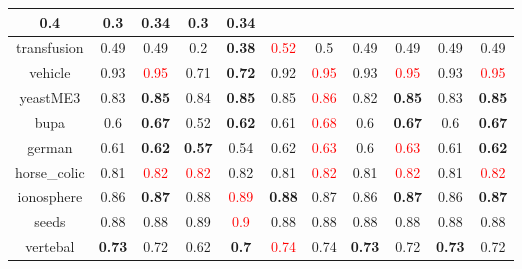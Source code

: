 \documentclass{article}%
\begin{document}
\begin{tabular}{c|cccccccccc}
{0.4
}&0.3&\textbf{0.34}&0.3&\textbf{0.34}\\%
\hline%
transfusion&0.49&0.49&0.2&\textbf{0.38}&\textcolor{red}{ 
0.52
}&0.5&0.49&0.49&0.49&0.49\\%
\hline%
vehicle&0.93&\textcolor{red}{ 
0.95
}&0.71&\textbf{0.72}&0.92&\textcolor{red}{ 
0.95
}&0.93&\textcolor{red}{ 
0.95
}&0.93&\textcolor{red}{ 
0.95
}\\%
\hline%
yeastME3&0.83&\textbf{0.85}&0.84&\textbf{0.85}&0.85&\textcolor{red}{ 
0.86
}&0.82&\textbf{0.85}&0.83&\textbf{0.85}\\%
\hline%
bupa&0.6&\textbf{0.67}&0.52&\textbf{0.62}&0.61&\textcolor{red}{ 
0.68
}&0.6&\textbf{0.67}&0.6&\textbf{0.67}\\%
\hline%
german&0.61&\textbf{0.62}&\textbf{0.57}&0.54&0.62&\textcolor{red}{ 
0.63
}&0.6&\textcolor{red}{ 
0.63
}&0.61&\textbf{0.62}\\%
\hline%
horse\_colic&0.81&\textcolor{red}{ 
0.82
}&\textcolor{red}{ 
0.82
}&0.82&0.81&\textcolor{red}{ 
0.82
}&0.81&\textcolor{red}{ 
0.82
}&0.81&\textcolor{red}{ 
0.82
}\\%
\hline%
ionosphere&0.86&\textbf{0.87}&0.88&\textcolor{red}{ 
0.89
}&\textbf{0.88}&0.87&0.86&\textbf{0.87}&0.86&\textbf{0.87}\\%
\hline%
seeds&0.88&0.88&0.89&\textcolor{red}{ 
0.9
}&0.88&0.88&0.88&0.88&0.88&0.88\\%
\hline%
vertebal&\textbf{0.73}&0.72&0.62&\textbf{0.7}&\textcolor{red}{ 
0.74
}&0.74&\textbf{0.73}&0.72&\textbf{0.73}&0.72\\%
\hline%
\end{tabular}

%
\end{document}
